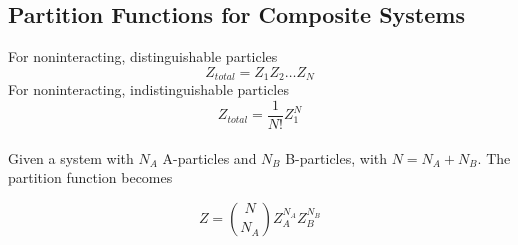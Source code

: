 \documentclass[a4paper,norsk, 10pt]{article}
\begin{document}
\subsection{Partition Functions for Composite Systems}
For noninteracting, distinguishable particles
\begin{equation}
Z_{total} = Z_1Z_2\ldots Z_N
\end{equation}
For noninteracting, indistinguishable particles
\begin{equation}
Z_{total} =\frac{1}{N!} Z_1^N
\end{equation}
\\
Given a system with $N_A$ A-particles and $N_B$ B-particles, with $N = N_A + N_B$. The partition function becomes

\begin{equation}
Z = \binom{N}{N_A}Z_A^{N_A}Z_B^{N_B}
\end{equation}
\end{document}
